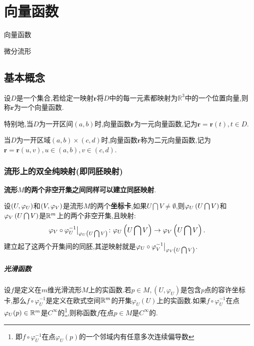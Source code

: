 \chapter{向量函数}
\begin{introduction}
\item 向量函数
\item 微分流形
\end{introduction}
\section{基本概念}
\begin{definition}
    设$D$是一个集合,若给定一映射$\mathbf{r}$将$D$中的每一元素都映射为$\mathbb{R}^3$中的一个位置向量,则称$\mathbf{r}$为一个向量函数.

    特别地,当$D$为一开区间$(a,b)$时,向量函数$\mathbf{r}$为一元向量函数,记为$\mathbf{r}=\mathbf{r}(t),t\in D$.

    当$D$为一开区域$(a,b)\times (c,d)$时,向量函数$\mathbf{r}$称为二元向量函数,记为$\mathbf{r}=\mathbf{r}(u,v),u\in (a,b),v\in (c,d)$.
\end{definition}
\subsection{流形上的双全纯映射(即同胚映射)}
\indent\textbf{流形$M$的两个非空开集之间同样可以建立同胚映射}.

设$\left(U,\varphi_U\right)$和$\left(V,\varphi_V\right)$是流形$M$的两个\textbf{坐标卡},如果$U\bigcap V\neq \emptyset$,则$\varphi_U \left(U\bigcap V\right)$和$\varphi_V \left(U\bigcap V\right)$是$\mathbb{R}^m$上的两个非空开集,且映射:
\begin{equation}\label{eq:流形上的同胚}
  \varphi_V\circ \varphi_U^{-1} \big|_{\varphi_U \left(U\bigcap V\right)}\colon \varphi_U \left(U\bigcap V\right)\to \varphi_V \left(U\bigcap V\right).
\end{equation}
建立起了这两个开集间的同胚,其逆映射就是$\varphi_U\circ \varphi_V^{-1}\big|_{\varphi_V \left(U\bigcap V\right)}$.

\paragraph{光滑函数}
设$f$是定义在$m$维光滑流形$M$上的实函数.若$p\in M,(U,\varphi_U)$是包含$p$点的容许坐标卡,那么$f\circ \varphi_U^{-1}$是定义在欧式空间$\mathbb{R}^m$的开集$\varphi_U (U)$上的实函数.如果$f\circ \varphi_U^{-1}$在点$\varphi_U (p)\in \mathbb{R}^m$是$C^\infty$的\footnote{即$f\circ \varphi_U^{-1}$在点$\varphi_U (p)$的一个邻域内有任意多次连续偏导数},则称函数$f$在点$p\in M$是$C^\infty$的.


